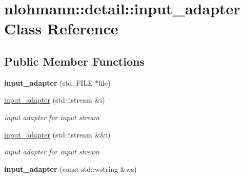 \hypertarget{classnlohmann_1_1detail_1_1input__adapter}{}\section{nlohmann\+:\+:detail\+:\+:input\+\_\+adapter Class Reference}
\label{classnlohmann_1_1detail_1_1input__adapter}
\subsection*{Public Member Functions}
\begin{DoxyCompactItemize}
\item 
\mbox{\label{classnlohmann_1_1detail_1_1input__adapter_a19fb8c28f37b23099a4353acf0a9a2f1}} 
{\bfseries input\+\_\+adapter} (std\+::\+F\+I\+LE $\ast$file)
\item 
\mbox{\label{classnlohmann_1_1detail_1_1input__adapter_ae89f11268d4724b3080473f7218abe86}} 
\hyperlink{classnlohmann_1_1detail_1_1input__adapter_ae89f11268d4724b3080473f7218abe86}{input\+\_\+adapter} (std\+::istream \&i)
\begin{DoxyCompactList}\small\item\em input adapter for input stream \end{DoxyCompactList}\item 
\mbox{\label{classnlohmann_1_1detail_1_1input__adapter_af002dd2e53ac0855a03cb68d0ce626b2}} 
\hyperlink{classnlohmann_1_1detail_1_1input__adapter_af002dd2e53ac0855a03cb68d0ce626b2}{input\+\_\+adapter} (std\+::istream \&\&i)
\begin{DoxyCompactList}\small\item\em input adapter for input stream \end{DoxyCompactList}\item 
\mbox{\label{classnlohmann_1_1detail_1_1input__adapter_a32f5ddd06562edce43ee86f5b5c2031b}} 
{\bfseries input\+\_\+adapter} (const std\+::wstring \&ws)
\item 
\mbox{\label{classnlohmann_1_1detail_1_1input__adapter_a58163eaa485b17dd878d3c782efc1e43}} 

\end{DoxyCompactItemize}
